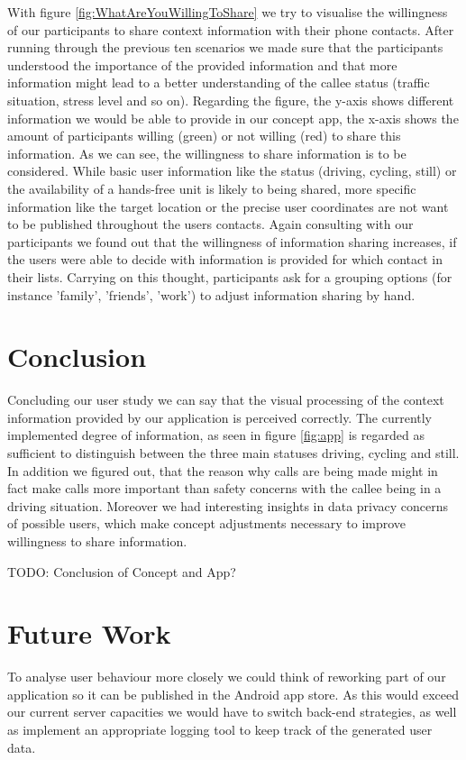 \documentclass{sigchi}
\begin{document}
With figure \ref{fig:WhatAreYouWillingToShare} we try to visualise the willingness of our participants to share context information with their phone contacts. After running through the previous ten scenarios we made sure that the participants understood the importance of the provided information and that more information might lead to a better understanding of the callee status (traffic situation, stress level and so on). Regarding the figure, the y-axis shows different information we would be able to provide in our concept app, the x-axis shows the amount of participants willing (green) or not willing (red) to share this information. As we can see, the willingness to share information is to be considered. While basic user information like the status (driving, cycling, still) or the availability of a hands-free unit is likely to being shared, more specific information like the target location or the precise user coordinates are not want to be published throughout the users contacts. Again consulting with our participants we found out that the willingness of information sharing increases, if the users were able to decide with information is provided for which contact in their lists. Carrying on this thought, participants ask for a grouping options (for instance 'family', 'friends', 'work') to adjust information sharing by hand.


\section{Conclusion}
Concluding our user study we can say that the visual processing of the context information provided by our application is perceived correctly. The currently implemented degree of information, as seen in figure \ref{fig:app} is regarded as sufficient to distinguish between the three main statuses driving, cycling and still. In addition we figured out, that the reason why calls are being made might in fact make calls more important than safety concerns with the callee being in a driving situation. Moreover we had interesting insights in data privacy concerns of possible users, which make concept adjustments necessary to improve willingness to share information.

TODO: Conclusion of Concept and App?

\section{Future Work}
To analyse user behaviour more closely we could think of reworking part of our application so it can be published in the Android app store. As this would exceed our current server capacities we would have to switch back-end strategies, as well as implement an appropriate logging tool to keep track of the generated user data.
\end{document}

